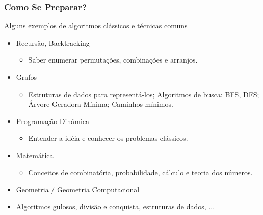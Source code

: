 \begin{frame}
\frametitle{Como Se Preparar?}
\begin{block}{Alguns exemplos de algoritmos clássicos e técnicas comuns}
\begin{itemize}	
	\item Recursão, Backtracking
	\begin{itemize}
		\item	Saber enumerar permutações, combinações e arranjos.
	\end{itemize}
	\item Grafos
	\begin{itemize}
		\item Estruturas de dados para representá-los; Algoritmos de busca: BFS, DFS; Árvore Geradora Mínima; Caminhos mínimos.
	\end{itemize}
	\item Programação Dinâmica
	\begin{itemize}	
		\item Entender a idéia e conhecer os problemas clássicos.
	\end{itemize}
	\item Matemática
	\begin{itemize}	
		\item Conceitos de combinatória, probabilidade, cálculo e teoria dos números.
	\end{itemize}
	\item Geometria / Geometria Computacional
	\item Algoritmos gulosos, divisão e conquista, estruturas de dados, ...
\end{itemize}
\end{block}
\end{frame}

